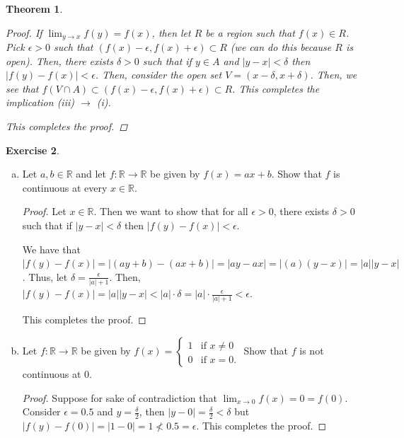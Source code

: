 \documentclass[11pt]{article}
\newcommand{\bbR}{\mathbb{R}}
\renewcommand{\_}[1]{\underline{ #1 }}
\newtheorem{theorem}{Theorem}[section]
\theoremstyle{definition}
\newtheorem{exercise}[theorem]{Exercise}
\numberwithin{equation}{subsection}
\begin{document}
\begin{theorem}
\begin{proof}
If $\displaystyle \lim_{y \to x} f(y) = f(x)$, then let $R$ be a region such that $f(x) \in R$. Pick $\epsilon>0$ such that $(f(x)-\epsilon, f(x)+\epsilon) \subset R$ (we can do this because $R$ is open). Then, there exists $\delta>0$ such that if $y\in A$ and $|y-x|<\delta$ then $|f(y)-f(x)|<\epsilon$. Then, consider the open set $V = (x-\delta, x+\delta)$. Then, we see that $f(V \cap A) \subset (f(x)-\epsilon, f(x)+\epsilon) \subset R$. This completes the implication (iii) $\rightarrow$ (i).

This completes the proof.

\renewcommand\qedsymbol{QED}
\end{proof}

\end{theorem}

\begin{exercise}
	\begin{enumerate}[(a)]
		\item Let $a, b\in \bbR$ and let $f\colon \bbR \to \bbR$ be given by $f(x) = ax + b$. Show that $f$ is continuous at every $x \in \bbR$.
        
\begin{proof}
Let $x \in \bbR$. Then we want to show that for all $\epsilon >0$, there exists $\delta>0$ such that if $|y-x|<\delta$ then $|f(y)-f(x)|<\epsilon$. 

We have that $|f(y)-f(x)|=|(ay+b)-(ax+b)|=|ay-ax|=|(a)(y-x)|=|a||y-x|$. Thus, let $\delta = \frac{\epsilon}{|a|+1}$. Then, $|f(y)-f(x)|=|a||y-x|<|a|\cdot \delta=|a|\cdot\frac{\epsilon}{|a|+1}<\epsilon$. 

This completes the proof.

\renewcommand\qedsymbol{QED}
\end{proof}


		\item Let $f\colon \bbR \to \bbR$ be given by $f(x) = 
		\begin{cases}
			1 & \text{if } x \neq 0 \\
			0 & \text{if }x = 0.
		\end{cases}$ \hspace{10pt}
		Show that $f$ is not continuous at $0$.
        
\begin{proof}

Suppose for sake of contradiction that $\lim_{x \to 0} f(x) = 0 = f(0)$. Consider $\epsilon = 0.5$ and $y = \frac{\delta}{2}$, then $|y-0|=\frac{\delta}{2}<\delta$ but $|f(y)-f(0)|=|1-0|=1\not < 0.5= \epsilon.$ This completes the proof.


\renewcommand\qedsymbol{QED}
\end{proof}


	\end{enumerate}
\end{exercise} 
\end{document}
